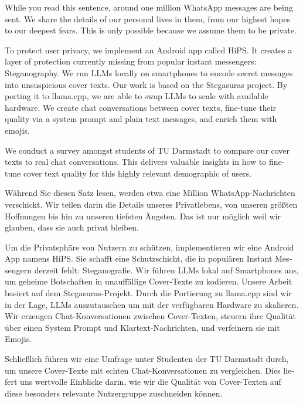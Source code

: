 
\begingroup
\let\clearpage\relax
\let\cleardoublepage\relax
\let\cleardoublepage\relax

While you read this sentence, around one million WhatsApp messages are being sent. We share the details of our personal lives in them, from our highest hopes to our deepest fears. This is only possible because we assume them to be private.

To protect user privacy, we implement an Android app called \gls{HiPS}. It creates a layer of protection currently missing from popular instant messengers: Steganography. We run \glspl{LLM} locally on smartphones to encode secret messages into unsuspicious cover texts. Our work is based on the Stegasuras project. By porting it to llama.cpp, we are able to swap \glspl{LLM} to scale with available hardware. We create chat conversations between cover texts, fine-tune their quality via a system prompt and plain text messages, and enrich them with emojis.

We conduct a survey amongst students of TU Darmstadt to compare our cover texts to real chat conversations. This delivers valuable insights in how to fine-tune cover text quality for this highly relevant demographic of users.

\vfill

\begin{otherlanguage}{ngerman}
Während Sie diesen Satz lesen, werden etwa eine Million WhatsApp-Nachrichten verschickt. Wir teilen darin die Details unseres Privatlebens, von unseren größten Hoffnungen bis hin zu unseren tiefsten Ängsten. Das ist nur möglich weil wir glauben, dass sie auch privat bleiben.

Um die Privatsphäre von Nutzern zu schützen, implementieren wir eine Android App namens \gls{HiPS}. Sie schafft eine Schutzschicht, die in populären Instant Messengern derzeit fehlt: Steganografie. Wir führen \glspl{LLM} lokal auf Smartphones aus, um geheime Botschaften in unauffällige Cover-Texte zu kodieren. Unsere Arbeit basiert auf dem Stegasuras-Projekt. Durch die Portierung zu llama.cpp sind wir in der Lage, \glspl{LLM} auszutauschen um mit der verfügbaren Hardware zu skalieren. Wir erzeugen Chat-Konversationen zwischen Cover-Texten, steuern ihre Qualität über einen System Prompt und Klartext-Nachrichten, und verfeinern sie mit Emojis.

Schließlich führen wir eine Umfrage unter Studenten der TU Darmstadt durch, um unsere Cover-Texte mit echten Chat-Konversationen zu vergleichen. Dies liefert uns wertvolle Einblicke darin, wie wir die Qualität von Cover-Texten auf diese besonders relevante Nutzergruppe zuschneiden können.
\end{otherlanguage}

\endgroup

\vfill
